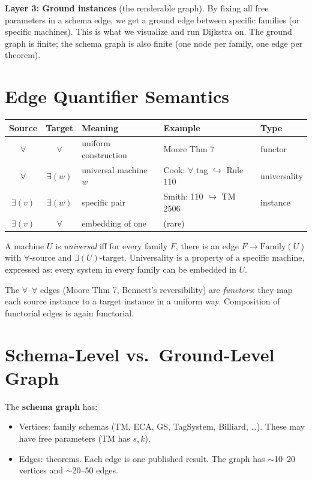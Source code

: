 \textbf{Layer 3: Ground instances} (the renderable graph).
By fixing all free parameters in a schema edge, we get a ground edge between
specific families (or specific machines). This is what we visualize and run
Dijkstra on. The ground graph is finite; the schema graph is also finite
(one node per family, one edge per theorem).

\section{Edge Quantifier Semantics}

\begin{center}
\begin{tabular}{cclll}
\toprule
Source & Target & Meaning & Example & Type \\
\midrule
$\forall$ & $\forall$ & uniform construction & Moore Thm 7 & functor \\
$\forall$ & $\exists(w)$ & universal machine $w$ & Cook: $\forall$ tag $\hookrightarrow$ Rule 110 & universality \\
$\exists(v)$ & $\exists(w)$ & specific pair & Smith: 110 $\hookrightarrow$ TM 2506 & instance \\
$\exists(v)$ & $\forall$ & embedding of one & (rare) & \\
\bottomrule
\end{tabular}
\end{center}

A machine $U$ is \emph{universal} iff for every family $F$, there is an edge
$F \to \mathrm{Family}(U)$ with $\forall$-source and $\exists(U)$-target.
Universality is a property of a specific machine, expressed as: every system
in every family can be embedded in $U$.

The $\forall$--$\forall$ edges (Moore Thm 7, Bennett's reversibility) are
\emph{functors}: they map each source instance to a target instance in a uniform
way. Composition of functorial edges is again functorial.

\section{Schema-Level vs.\ Ground-Level Graph}

\begin{definition}\label{ug-def}
\leanok
{}
The \textbf{schema graph} has:
\begin{itemize}
\item Vertices: family schemas (TM, ECA, GS, TagSystem, Billiard, \ldots).
  These may have free parameters (TM has $s,k$).
\item Edges: theorems. Each edge is one published result. The graph has
  $\sim$10--20 vertices and $\sim$20--50 edges.
\end{itemize}
\end{definition}

